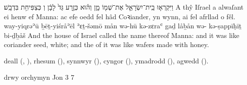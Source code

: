 
\begin{example}{2}{16}{31}{}{}
	\quoling
	{וַיִּקְרְא֧וּ בֵֽית־יִשְׂרָאֵ֛ל אֶת־שְׁמ֖וֹ מָ֑ן וְה֗וּא כְּזֶ֤רַע גַּד֙ לָבָ֔ן וְ כְּצַפִּיחִ֥ת בִּדְבָֽשׁ׃}
	{A thŷ Iſrael a alwaſant ei henw ef Manna: ac efe oedd fel hâd Coꝛiander, yn wynn, ai  fel afrllad o fêl.}
	{way-yiqrəʾū ḇēṯ-yiśråʾēl ʾɛṯ-šəmō mån wə-hū kə-zɛraʿ gaḏ låḇån wə- kə-ṣappīḥīṯ bi-ḏḇåš}
	{And the house of Israel called the name thereof Manna: and it was like coriander seed, white; and the  of it was like wafers made with honey.}
\end{example}

\tounfold{}
deall (, ),
rhesum (),
synnwyr (),
cyngor (),
ymadrodd (),
agwedd ().

\tounfold{}
drwy orchymyn
Jon	3	7
